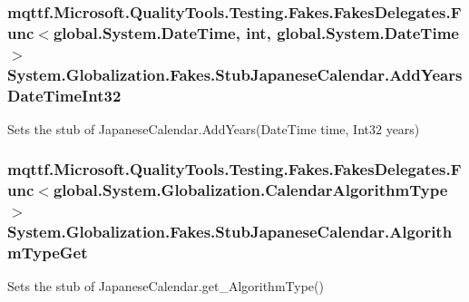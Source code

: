 \hypertarget{class_system_1_1_globalization_1_1_fakes_1_1_stub_japanese_calendar_a6a95608a4f4d70f6a83a4ac3a7e526de}{
\subsubsection[{Add\-Years\-Date\-Time\-Int32}]{\setlength{\rightskip}{0pt plus 5cm}mqttf.\-Microsoft.\-Quality\-Tools.\-Testing.\-Fakes.\-Fakes\-Delegates.\-Func$<$global.\-System.\-Date\-Time, int, global.\-System.\-Date\-Time$>$ System.\-Globalization.\-Fakes.\-Stub\-Japanese\-Calendar.\-Add\-Years\-Date\-Time\-Int32}}\label{class_system_1_1_globalization_1_1_fakes_1_1_stub_japanese_calendar_a6a95608a4f4d70f6a83a4ac3a7e526de}


Sets the stub of Japanese\-Calendar.\-Add\-Years(\-Date\-Time time, Int32 years)

\hypertarget{class_system_1_1_globalization_1_1_fakes_1_1_stub_japanese_calendar_ae442b2d968b43faa59d1f5e8960ae173}{
\subsubsection[{Algorithm\-Type\-Get}]{\setlength{\rightskip}{0pt plus 5cm}mqttf.\-Microsoft.\-Quality\-Tools.\-Testing.\-Fakes.\-Fakes\-Delegates.\-Func$<$global.\-System.\-Globalization.\-Calendar\-Algorithm\-Type$>$ System.\-Globalization.\-Fakes.\-Stub\-Japanese\-Calendar.\-Algorithm\-Type\-Get}}\label{class_system_1_1_globalization_1_1_fakes_1_1_stub_japanese_calendar_ae442b2d968b43faa59d1f5e8960ae173}


Sets the stub of Japanese\-Calendar.\-get\-\_\-\-Algorithm\-Type()

